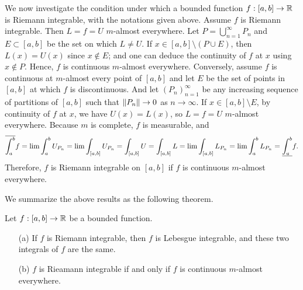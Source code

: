 We now investigate the condition under which a bounded function $f: [a, b]\rightarrow{\mathbb{R}}$ is Riemann integrable, with the notations given above.
Assume $f$ is Riemann integrable.
Then $L=f=U$ $m$-almost everywhere.
Let $P=\bigcup_{n=1}^\infty P_n$ and $E\subset[a, b]$ be the set on which $L\neq U$.
If $x\in[a, b]\setminus (P\cup E)$, then $L(x)=U(x)$ since $x\notin E$; and one can deduce the continuity of $f$ at $x$ using $x\notin P$.
Hence, $f$ is continuous $m$-almost everywhere.
Conversely, assume $f$ is continuous at $m$-almost every point of $[a, b]$ and let $E$ be the set of points in $[a, b]$ at which $f$ is discontinuous.
And let $(P_n)_{n=1}^\infty$ be any increasing sequence of partitions of $[a, b]$ such that ${\left\lVert{P_n}\right\rVert}\rightarrow 0$ as $n\rightarrow\infty$.
If $x\in[a, b]\setminus E$, by continuity of $f$ at $x$, we have $U(x)=L(x)$, so $L=f=U$ $m$-almost everywhere.
Because $m$ is complete, $f$ is measurable, and
\begin{align*}
    \overline{\int_a^b}f=\lim\int_a^b U_{P_n}=\lim\int_{[a, b]} U_{P_n}=\int_{[a, b]}U
    =\int_{[a, b]}L=\lim\int_{[a, b]} L_{P_n}=\lim\int_a^b L_{P_n}=\underline{\int_a^b}f.
\end{align*}
Therefore, $f$ is Riemann integrable on $[a, b]$ if $f$ is continuous $m$-almost everywhere.

We summarize the above results as the following theorem.
\begin{thm}
    Let $f: [a, b]\rightarrow{\mathbb{R}}$ be a bounded function.
    \begin{enumerate}
        \item[(a)]
        {
            If $f$ is Riemann integrable, then $f$ is Lebesgue integrable, and these two integrals of $f$ are the same.
        }
        \item[(b)]
        {
            $f$ is Rieamann integrable if and only if $f$ is continuous $m$-almost everywhere.
        }
    \end{enumerate}
\end{thm}

